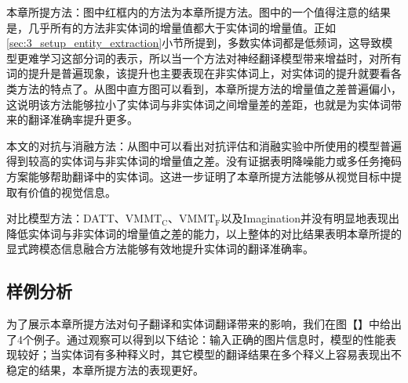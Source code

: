 {\sffamily 本章所提方法：}图中红框内的方法为本章所提方法。图中的一个值得注意的结果是，几乎所有的方法非实体词的增量值都大于实体词的增量值。正如\ref{sec:3_setup_entity_extraction}小节所提到，多数实体词都是低频词，这导致模型更难学习这部分词的表示，所以当一个方法对神经翻译模型带来增益时，对所有词的提升是普遍现象，该提升也主要表现在非实体词上，对实体词的提升就要看各类方法的特点了。从图中直方图可以看到，本章所提方法的增量值之差普遍偏小，这说明该方法能够拉小了实体词与非实体词之间增量差的差距，也就是为实体词带来的翻译准确率提升更多。

{\sffamily 本文的对抗与消融方法：}从图中可以看出对抗评估和消融实验中所使用的模型普遍得到较高的实体词与非实体词的增量值之差。没有证据表明降噪能力或多任务掩码方案能够帮助翻译中的实体词。这进一步证明了本章所提方法能够从视觉目标中提取有价值的视觉信息。

{\sffamily 对比模型方法：}DATT、$ \mathrm{VMMT_C} $、$ \mathrm{VMMT_F} $以及Imagination并没有明显地表现出降低实体词与非实体词的增量值之差的能力，以上整体的对比结果表明本章所提的显式跨模态信息融合方法能够有效地提升实体词的翻译准确率。

\subsection{样例分析}
为了展示本章所提方法对句子翻译和实体词翻译带来的影响，我们在图【】中给出了4个例子。通过观察可以得到以下结论：输入正确的图片信息时，模型的性能表现较好；当实体词有多种释义时，其它模型的翻译结果在多个释义上容易表现出不稳定的结果，本章所提方法的表现更好。